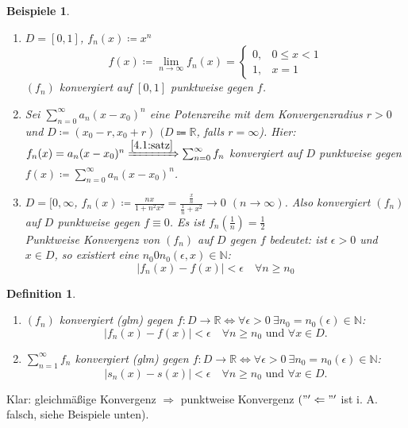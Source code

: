 \documentclass[14pt,titlepage,ngerman,a4paper,headsepline,DIV15,halfparskip*]{scrartcl}
\newcommand{\N}{\mathbb{N}}
\newcommand{\R}{\mathbb{R}}
\theoremstyle{named}
\theoremstyle{dotless}
\newtheorem*{beispiele}{Beispiele}
\newtheorem*{definition}{Definition}
\begin{document}
\begin{beispiele} ~\
	\begin{enumerate}
		\item $D = [0,1]$, $f_{n}(x) \coloneqq x^{n}$ %
			$$ f(x) \coloneqq \lim_{n\rightarrow\infty} f_{n}(x) = \begin{cases} 0, & 0 \leq x < 1 \\  1, & x = 1 \end{cases} $$
			$(f_{n})$ konvergiert auf $[0, 1]$ punktweise gegen $f$.
		\item Sei $\sum_{n=0}^{\infty} a_{n} (x-x_{0})^{n}$ eine Potenzreihe mit dem Konvergenzradius $r > 0$ und $D \coloneqq (x_{0} - r, x_{0} + r)$ $(D \Coloneqq \R$, falls $r = \infty$). Hier: $f_{n}(x) = a_{n} (x - x_{0})^{n} \xRightarrow[]{\ref{4.1:satz}} \sum_{n=0}^{\infty} f_{n}$ konvergiert auf $D$ punktweise gegen $f(x) \coloneqq \sum_{n=0}^{\infty} a_{n} (x-x_{0})^{n}$.
		\item $D = [0, \infty$, $f_{n}(x) \coloneqq \frac{nx}{1+n^{2}x^{2}} = \frac{\frac{x}{n}}{\frac{1}{n} + x^{2}} \rightarrow 0$ $(n \rightarrow \infty)$. Also konvergiert $(f_{n})$ auf $D$ punktweise gegen $f \equiv 0$. Es ist $f_{n}(\frac{1}{n}) = \frac{1}{2}$ \\
			Punktweise Konvergenz von $(f_{n})$ auf $D$ gegen $f$ bedeutet: ist $\epsilon > 0$ und $x \in D$, so existiert eine $n_{0} 0 n_{0}(\epsilon, x) \in \N$:
			$$ |f_{n}(x) - f(x)| < \epsilon \quad \forall n \geq n_{0} $$
	\end{enumerate}
\end{beispiele}


\begin{definition} ~\
	\begin{enumerate}
		\item $(f_{n})$ konvergiert (glm) gegen $f \colon D \rightarrow \R \iff \forall \epsilon > 0 ~\exists n_{0} = n_{0}(\epsilon) \in \N$:
			$$ |f_{n}(x) - f(x)|< \epsilon \quad \forall n \geq n_{0} \text{ und } \forall x \in D. $$
		\item $\sum_{n=1}^{\infty} f_{n}$  konvergiert \text{auf D gleichmä{\ss}ig}(glm) gegen $f \colon D \rightarrow \R \iff \forall \epsilon > 0 ~\exists n_{0} = n_{0}(\epsilon) \in \N$:
			$$ |s_{n}(x) - s(x)|< \epsilon \quad \forall n \geq n_{0} \text{ und } \forall x \in D. $$
	\end{enumerate}
\end{definition}

Klar: gleichmä{\ss}ige Konvergenz $\Rightarrow$ punktweise Konvergenz $("'\Leftarrow"'$ ist i. A. falsch, siehe Beispiele unten). \\
\end{document}
